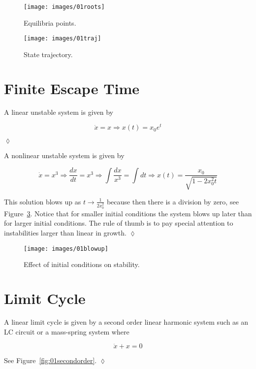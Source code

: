 \begin{figure}[ht!]
\centering
\texttt{[image: images/01roots]}
\caption{Equilibria points.}%
\label{fig:01roots}
\end{figure}

\begin{figure}[ht!]
\centering
\texttt{[image: images/01traj]}
\caption{State trajectory.}%
\label{fig:01traj}
\end{figure}

\section{Finite Escape Time}%
\label{sec:01fet}
\begin{example}
A linear unstable system is given by

\begin{equation*}
\dot{x} = x \Rightarrow x(t) = x_0e^t
\end{equation*}

$\lozenge$
\end{example}

\begin{example}
A nonlinear unstable system is given by

\begin{equation*}
\dot{x} = x^3 \Rightarrow \frac{dx}{dt}=x^3 \Rightarrow \int\frac{dx}{x^3} = \int dt \Rightarrow x(t) = \frac{x_0}{\sqrt{1-2x_0^2t}}
\end{equation*}

This solution blows up as $t\to\frac{1}{2x_0^2}$ because then there is a division by zero, see Figure~\ref{fig:01blowup}.
Notice that for smaller initial conditions the system blows up later than for larger initial conditions.
The rule of thumb is to pay special attention to instabilities larger than linear in growth.
$\lozenge$
\end{example}

\begin{figure}[ht!]
\centering
\texttt{[image: images/01blowup]}
\caption{Effect of initial conditions on stability.}%
\label{fig:01blowup}
\end{figure}

\section{Limit Cycle}
\begin{example}
A linear limit cycle is given by a second order linear harmonic system such as an LC circuit or a mass-spring system where

\begin{equation*}
\ddot{x} + x = 0
\end{equation*}

See Figure~\ref{fig:01secondorder}.
$\lozenge$
\end{example}

